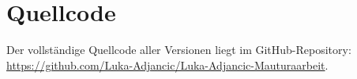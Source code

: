 \section{Quellcode}
Der vollständige Quellcode aller Versionen liegt im GitHub-Repository: \url{https://github.com/Luka-Adjancic/Luka-Adjancic-Mauturaarbeit}.